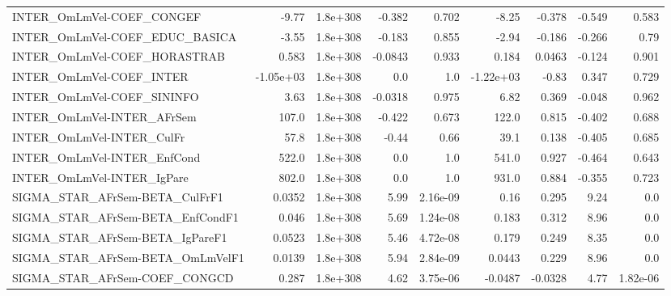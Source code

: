 \begin{tabular}{lrrrrrrrr}
INTER\_OmLmVel-COEF\_CONGEF             &       -9.77 &     1.8e+308 &   -0.382 &    0.702 &      -8.25 &      -0.378 &       -0.549 &         0.583 \\
INTER\_OmLmVel-COEF\_EDUC\_BASICA        &       -3.55 &     1.8e+308 &   -0.183 &    0.855 &      -2.94 &      -0.186 &       -0.266 &          0.79 \\
INTER\_OmLmVel-COEF\_HORASTRAB          &       0.583 &     1.8e+308 &  -0.0843 &    0.933 &      0.184 &      0.0463 &       -0.124 &         0.901 \\
INTER\_OmLmVel-COEF\_INTER              &   -1.05e+03 &     1.8e+308 &      0.0 &      1.0 &  -1.22e+03 &       -0.83 &        0.347 &         0.729 \\
INTER\_OmLmVel-COEF\_SININFO            &        3.63 &     1.8e+308 &  -0.0318 &    0.975 &       6.82 &       0.369 &       -0.048 &         0.962 \\
INTER\_OmLmVel-INTER\_AFrSem            &       107.0 &     1.8e+308 &   -0.422 &    0.673 &      122.0 &       0.815 &       -0.402 &         0.688 \\
INTER\_OmLmVel-INTER\_CulFr             &        57.8 &     1.8e+308 &    -0.44 &     0.66 &       39.1 &       0.138 &       -0.405 &         0.685 \\
INTER\_OmLmVel-INTER\_EnfCond           &       522.0 &     1.8e+308 &      0.0 &      1.0 &      541.0 &       0.927 &       -0.464 &         0.643 \\
INTER\_OmLmVel-INTER\_IgPare            &       802.0 &     1.8e+308 &      0.0 &      1.0 &      931.0 &       0.884 &       -0.355 &         0.723 \\
SIGMA\_STAR\_AFrSem-BETA\_CulFrF1        &      0.0352 &     1.8e+308 &     5.99 & 2.16e-09 &       0.16 &       0.295 &         9.24 &           0.0 \\
SIGMA\_STAR\_AFrSem-BETA\_EnfCondF1      &       0.046 &     1.8e+308 &     5.69 & 1.24e-08 &      0.183 &       0.312 &         8.96 &           0.0 \\
SIGMA\_STAR\_AFrSem-BETA\_IgPareF1       &      0.0523 &     1.8e+308 &     5.46 & 4.72e-08 &      0.179 &       0.249 &         8.35 &           0.0 \\
SIGMA\_STAR\_AFrSem-BETA\_OmLmVelF1      &      0.0139 &     1.8e+308 &     5.94 & 2.84e-09 &     0.0443 &       0.229 &         8.96 &           0.0 \\
SIGMA\_STAR\_AFrSem-COEF\_CONGCD         &       0.287 &     1.8e+308 &     4.62 & 3.75e-06 &    -0.0487 &     -0.0328 &         4.77 &      1.82e-06 \\

\end{tabular}
